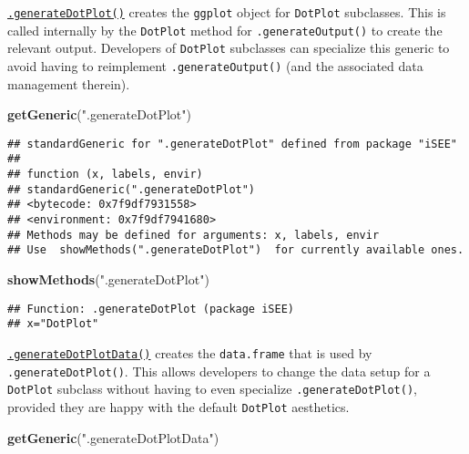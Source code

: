 \documentclass[
]{book}
\newenvironment{Shaded}{\begin{snugshade}}{\end{snugshade}}
\newcommand{\KeywordTok}[1]{\textcolor[rgb]{0.13,0.29,0.53}{\textbf{#1}}}
\newcommand{\NormalTok}[1]{#1}
\newcommand{\StringTok}[1]{\textcolor[rgb]{0.31,0.60,0.02}{#1}}
\begin{document}
\href{https://isee.github.io/iSEE/reference/plot-generics.html}{\texttt{.generateDotPlot()}} creates the \texttt{ggplot} object for \texttt{DotPlot} subclasses.
This is called internally by the \texttt{DotPlot} method for \texttt{.generateOutput()} to create the relevant output.
Developers of \texttt{DotPlot} subclasses can specialize this generic to avoid having to reimplement \texttt{.generateOutput()} (and the associated data management therein).

\begin{Shaded}
\begin{Highlighting}[]
\KeywordTok{getGeneric}\NormalTok{(}\StringTok{".generateDotPlot"}\NormalTok{)}
\end{Highlighting}
\end{Shaded}

\begin{verbatim}
## standardGeneric for ".generateDotPlot" defined from package "iSEE"
## 
## function (x, labels, envir) 
## standardGeneric(".generateDotPlot")
## <bytecode: 0x7f9df7931558>
## <environment: 0x7f9df7941680>
## Methods may be defined for arguments: x, labels, envir
## Use  showMethods(".generateDotPlot")  for currently available ones.
\end{verbatim}

\begin{Shaded}
\begin{Highlighting}[]
\KeywordTok{showMethods}\NormalTok{(}\StringTok{".generateDotPlot"}\NormalTok{)}
\end{Highlighting}
\end{Shaded}

\begin{verbatim}
## Function: .generateDotPlot (package iSEE)
## x="DotPlot"
\end{verbatim}

\href{https://isee.github.io/iSEE/reference/plot-generics.html}{\texttt{.generateDotPlotData()}} creates the \texttt{data.frame} that is used by \texttt{.generateDotPlot()}.
This allows developers to change the data setup for a \texttt{DotPlot} subclass without having to even specialize \texttt{.generateDotPlot()}, provided they are happy with the default \texttt{DotPlot} aesthetics.

\begin{Shaded}
\begin{Highlighting}[]
\KeywordTok{getGeneric}\NormalTok{(}\StringTok{".generateDotPlotData"}\NormalTok{)}
\end{Highlighting}
\end{Shaded}
\end{document}
